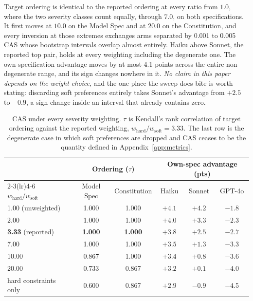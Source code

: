 \documentclass{article}
\begin{document}
Target ordering is identical to the reported ordering at every ratio from $1.0$, where the two
severity classes count equally, through $7.0$, on both specifications. It first moves at $10.0$
on the Model Spec and at $20.0$ on the Constitution, and every inversion at those extremes
exchanges arms separated by 0.001 to 0.005 CAS whose bootstrap intervals overlap almost
entirely. Haiku above Sonnet, the reported top pair, holds at every weighting including the degenerate
one. The own-specification advantage moves by at most 4.1 points across the entire
non-degenerate range, and its sign changes nowhere in it. \emph{No claim in this paper depends on
the weight choice}, and the one place the sweep does bite is worth stating: discarding soft
preferences entirely takes Sonnet's advantage from $+2.5$ to $-0.9$, a sign change inside an
interval that already contains zero.

\begin{table}[h]
\centering
\small
\setlength{\tabcolsep}{5pt}
\caption{CAS under every severity weighting. $\tau$ is Kendall's rank correlation of target
ordering against the reported weighting, $w_{\text{hard}}/w_{\text{soft}} = 3.33$. The last row
is the degenerate case in which soft preferences are dropped and CAS ceases to be the quantity
defined in Appendix~\ref{app:metrics}.}
\label{tab:severity}
\begin{tabular}{@{}lccccc@{}}
\toprule
& \multicolumn{2}{c}{\textbf{Ordering} ($\tau$)} & \multicolumn{3}{c}{\textbf{Own-spec advantage} (pts)} \\
\cmidrule(lr){2-3}\cmidrule(lr){4-6}
$w_{\text{hard}}/w_{\text{soft}}$ & Model Spec & Constitution & Haiku & Sonnet & GPT-4o \\
\midrule
1.00 (unweighted) & 1.000 & 1.000 & $+4.1$ & $+4.2$ & $-1.8$ \\
2.00 & 1.000 & 1.000 & $+4.0$ & $+3.3$ & $-2.3$ \\
\textbf{3.33} (reported) & \textbf{1.000} & \textbf{1.000} & $\mathbf{+3.8}$ & $\mathbf{+2.5}$ & $\mathbf{-2.7}$ \\
7.00 & 1.000 & 1.000 & $+3.5$ & $+1.3$ & $-3.3$ \\
10.00 & 0.867 & 1.000 & $+3.4$ & $+0.8$ & $-3.6$ \\
20.00 & 0.733 & 0.867 & $+3.2$ & $+0.1$ & $-4.0$ \\
\midrule
hard constraints only & 0.600 & 0.867 & $+2.9$ & $-0.9$ & $-4.5$ \\
\bottomrule
\end{tabular}
\end{table}
\end{document}
